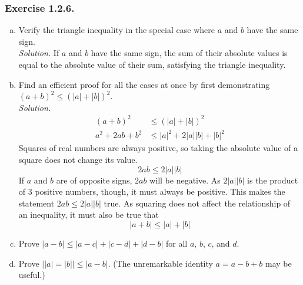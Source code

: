 \documentclass[../Exercises.tex]{subfiles}
\begin{document}
		\subsubsection*{Exercise 1.2.6.}
			\begin{enumerate}[(a)]
				\item
					Verify the triangle inequality in the special case  where $a$ and $b$ have the same sign. \\
						\emph{Solution.}
							If $a$ and $b$ have the same sign, the sum of their absolute values is equal to the absolute value of their sum, satisfying the triangle inequality.
				\item
					Find an efficient proof for all the cases at once by first demonstrating $(a + b)^2 \le (|a| + |b|)^2$. \\
						\emph{Solution.}
							\begin{align*}
								(a + b)^2 &\le (|a| + |b|)^2 \\
								a^2 + 2ab + b^2 &\le |a|^2 + 2|a||b| + |b|^2
							\end{align*}
						Squares of real numbers are always positive, so taking the absolute value of a square does not change its value.
							\[2ab \le 2|a||b|\]
						If $a$ and $b$ are of opposite signs, $2ab$ will be negative. As $2|a||b|$ is the product of 3 positive numbers, though, it must always be positive. This makes the statement $2ab \le 2|a||b|$ true. As squaring does not affect the relationship of an inequality, it must also be true that
							\[|a + b| \le |a| + |b|\]
				\item
					Prove $|a - b| \le |a - c| + |c - d| + |d - b|$ for all $a$, $b$, $c$, and $d$.
				\item
					Prove $||a| = |b|| \le |a - b|$. (The unremarkable identity $a = a - b + b$ may be useful.)
			\end{enumerate}
\end{document}
